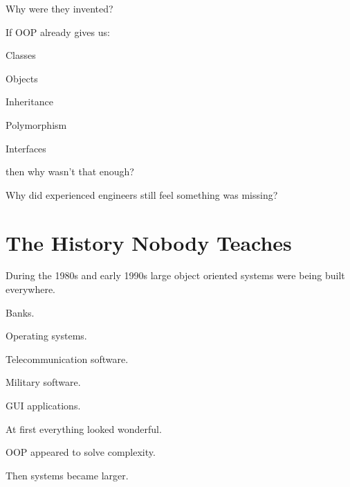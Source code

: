 \documentclass[11pt,a4paper]{book}
\begin{document}
Why were they invented?


If OOP already gives us:

Classes

Objects

Inheritance

Polymorphism

Interfaces


then why wasn't that enough?


Why did experienced engineers
still feel something was missing?


\section{The History Nobody Teaches}

During the 1980s and early 1990s
large object oriented systems were
being built everywhere.


Banks.


Operating systems.


Telecommunication software.


Military software.


GUI applications.


At first everything looked wonderful.


OOP appeared to solve complexity.


Then systems became larger.
\end{document}
